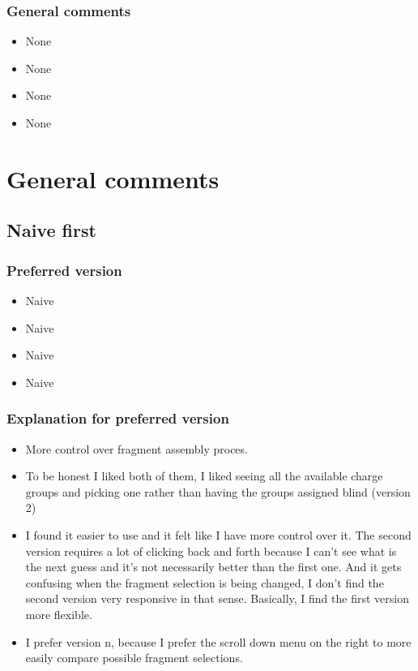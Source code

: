 \subsubsection{General comments}
\begin{itemize}
\item None

\item None

\item None

\item None

\end{itemize}


\section{General comments}
\subsection{Naive first}
\subsubsection{Preferred version}
\begin{itemize}
\item Naive

\item Naive

\item Naive

\item Naive

\end{itemize}


\subsubsection{Explanation for preferred version}
\begin{itemize}
\item More control over fragment assembly proces. 

\item To be honest I liked both of them, I liked seeing all the available charge groups and picking one rather than having the groups assigned blind (version 2)

\item I found it easier to use and it felt like I have more control over it. The second version requires a lot of clicking back and forth because I can't see what is the next guess and it's not necessarily better than the first one. And it gets confusing when the fragment selection is being changed, I don't find the second version very responsive in that sense. Basically, I find the first version more flexible.

\item I prefer version n, because I prefer the scroll down menu on the right to more easily compare possible fragment selections.

\end{itemize}


